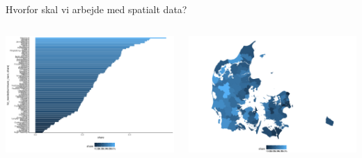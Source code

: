 \documentclass[
  8pt,
  ignorenonframetext,
  aspectratio=169]{beamer}
\newcommand{\columnsbegin}{\begin{columns}}
\newcommand{\columnsend}{\end{columns}}
\begin{document}
\begin{frame}{Hvorfor skal vi arbejde med spatialt data?}
\protect\hypertarget{hvorfor-skal-vi-arbejde-med-spatialt-data}{}
\tiny

\normalsize

\columnsbegin
{}

\tiny

\includegraphics[width=1\linewidth]{crashcourse_slides_files/figure-beamer/unnamed-chunk-2-1}

\normalsize


\tiny

\includegraphics[width=1\linewidth]{crashcourse_slides_files/figure-beamer/unnamed-chunk-3-1}

\normalsize

\columnsend
\end{frame}
\end{document}
